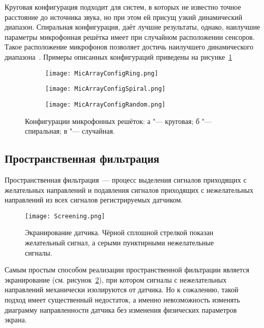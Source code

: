 Круговая конфигурация подходит для систем, в которых не известно точное расстояние до источника звука, но при этом ей присущ узкий динамический диапазон. Спиральная конфигурация, даёт лучшие результаты, однако, наилучшие параметры микрофонная решётка имеет при случайном расположении сенсоров. Такое расположение микрофонов позволяет достичь наилучшего динамического диапазона~\cite[с.~5]{NI_AcousticBeamforming}. Примеры описанных конфигураций приведены на рисунке~\ref{fig:MicArrayConfigs}

\begin{figure}[ht]
\centering
  \begin{subfigure}[b]{0.45\textwidth} 
    \centering
    \texttt{[image: MicArrayConfigRing.png]}  
    \caption{}
  \end{subfigure}
  \begin{subfigure}[b]{0.45\textwidth} 
    \centering
    \texttt{[image: MicArrayConfigSpiral.png]}  
    \caption{}
  \end{subfigure}
  \begin{subfigure}[b]{0.45\textwidth} 
    \centering
    \texttt{[image: MicArrayConfigRandom.png]}  
    \caption{}
  \end{subfigure}
  \caption{ Конфигурации микрофонных решёток:
			а "--- круговая;
            б "--- спиральная;
			в "--- случайная.}
  \label{fig:MicArrayConfigs}
\end{figure}

\subsection{Пространственная фильтрация}
\label{section:SpatialFiltering}
Пространственная фильтрация~--- процесс выделения сигналов приходящих с желательных направлений и подавления сигналов приходящих с нежелательных направлений из всех сигналов регистрируемых датчиком. 

\begin{figure}[ht]
	\centering
	\texttt{[image: Screening.png]}  
	\caption{Экранирование датчика. Чёрной сплошной стрелкой показан желательный сигнал, а серыми пунктирными нежелательные сигналы.}
	\label{fig:Screening}
\end{figure}

Самым простым способом реализации пространственной фильтрации является экранирование (см. рисунок~\ref{fig:Screening}), при котором сигналы с нежелательных направлений механически изолируются от датчика. Но к сожалению, такой подход имеет существенный недостаток, а именно невозможность изменять диаграмму направленности датчика без изменения физических параметров экрана.


